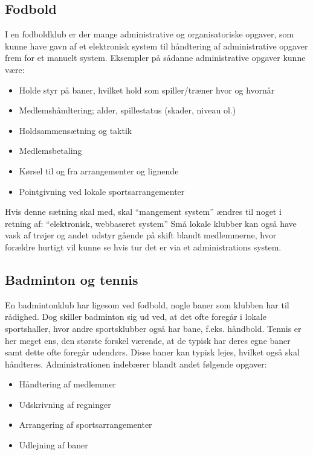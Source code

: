 \subsection{Fodbold} \label{Fodbold}
I en fodboldklub er der mange administrative og organisatoriske opgaver, som kunne have gavn af et elektronisk system
til håndtering af administrative opgaver frem for et manuelt system. Eksempler på sådanne
administrative opgaver kunne være:

\begin{itemize}
\item Holde styr på baner, hvilket hold som spiller/træner hvor og hvornår
\item Medlemshåndtering; alder, spillestatus (skader, niveau ol.)
\item Holdsammensætning og taktik
\item Medlemsbetaling
\item Kørsel til og fra arrangementer og lignende
\item Pointgivning ved lokale sportsarrangementer
\end{itemize}

\begin{anfxnote}{Hvis denne sætning skal med, skal ``mangement system'' ændres til noget i retning af: ``elektronisk, webbaseret system''}
Små lokale klubber kan også have vask af trøjer og andet udstyr gående på skift blandt medlemmerne, hvor forældre hurtigt vil kunne se hvis tur det er via et administrations system. 
\end{anfxnote}


\subsection{Badminton og tennis}
En badmintonklub har ligesom ved fodbold, nogle baner som klubben har til rådighed. Dog skiller badminton sig ud ved, at det ofte foregår i lokale sportshaller, hvor andre sportsklubber også har bane, f.eks. håndbold. Tennis er her meget ens, den største forskel værende, at de typisk har deres egne baner samt dette ofte foregår udendørs. Disse baner kan typisk lejes, hvilket også skal håndteres. Administrationen indebærer blandt andet følgende opgaver:
\begin{itemize}
\item Håndtering af medlemmer
\item Udskrivning af regninger
\item Arrangering af sportsarrangementer
\item Udlejning af baner
\end{itemize}

